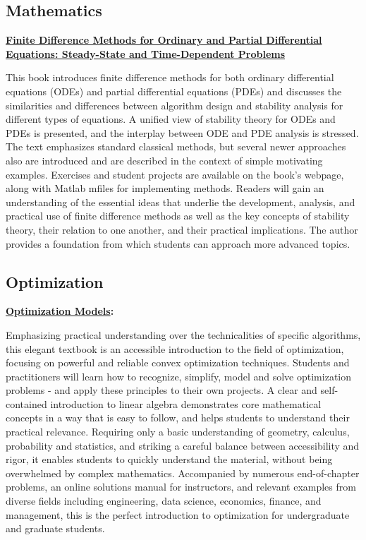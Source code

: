 
\subsection{Mathematics}
\label{sub_sec:diffeq}
\textbf{\href{https://a.co/d/f4xltYH}{Finite Difference Methods for Ordinary and Partial Differential Equations: Steady-State and Time-Dependent Problems}}

This book introduces finite difference methods for both ordinary differential equations (ODEs) and partial differential equations (PDEs) and discusses the similarities and differences between algorithm design and stability analysis for different types of equations. A unified view of stability theory for ODEs and PDEs is presented, and the interplay between ODE and PDE analysis is stressed. The text emphasizes standard classical methods, but several newer approaches also are introduced and are described in the context of simple motivating examples. Exercises and student projects are available on the book's webpage, along with Matlab mfiles for implementing methods. Readers will gain an understanding of the essential ideas that underlie the development, analysis, and practical use of finite difference methods as well as the key concepts of stability theory, their relation to one another, and their practical implications. The author provides a foundation from which students can approach more advanced topics.

\subsection{Optimization}
\label{sub_sec:optimization}

\textbf{\href{https://a.co/d/0vaEILG}{Optimization Models}:} 

Emphasizing practical understanding over the technicalities of specific algorithms, this elegant textbook is an accessible introduction to the field of optimization, focusing on powerful and reliable convex optimization techniques. Students and practitioners will learn how to recognize, simplify, model and solve optimization problems - and apply these principles to their own projects. A clear and self-contained introduction to linear algebra demonstrates core mathematical concepts in a way that is easy to follow, and helps students to understand their practical relevance. Requiring only a basic understanding of geometry, calculus, probability and statistics, and striking a careful balance between accessibility and rigor, it enables students to quickly understand the material, without being overwhelmed by complex mathematics. Accompanied by numerous end-of-chapter problems, an online solutions manual for instructors, and relevant examples from diverse fields including engineering, data science, economics, finance, and management, this is the perfect introduction to optimization for undergraduate and graduate students.

